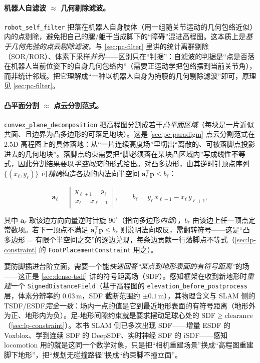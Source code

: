 \paragraph{机器人自滤波 $\approx$ 几何剔除滤波。}
\texttt{robot\_self\_filter} 把落在机器人自身肢体（用一组随关节运动的几何包络近似）内的点剔除，避免把自己的腿/躯干当成脚下的“障碍”混进高程图。这本质上是\emph{基于几何先验的点云剔除滤波}，与 \cref{sec:pc-filter} 里讲的统计离群剔除（SOR/ROR）、体素下采样\emph{并列}——区别只在“判据”：自滤波的判据是“点是否落在机器人当前位姿下的自身几何包络内”（需要正运动学把包络摆到当前关节角），而非统计邻域。把它理解成“一种以机器人自身为掩膜的几何剔除滤波”即可，原理见 \cref{sec:pc-filter}。

\paragraph{凸平面分割 $\approx$ 点云分割范式。}
\texttt{convex\_plane\_decomposition} 把高程图分割成若干\emph{凸平面区域}（每块是一片近似共面、且边界为凸多边形的可落足地块）。这是 \cref{sec:pc-paradigm} 点云分割范式在 $2.5$D 高程图上的具体落地：从“一片连续高度场”里切出“离散的、可被落脚点投影进去的几何地块”。落脚点约束需要把“脚必须落在某块凸区域内”写成线性不等式，因此分割结果要以\emph{半空间交}的形式给出。对凸多边形，由其逆时针顶点序列 $\{(x_\ell,y_\ell)\}$ 可\emph{精确}构造各边的内法向半空间 $\mathbf{a}_\ell^\top \mathbf{p}\le b_\ell$：

\begin{equation}
  \mathbf{a}_\ell=\begin{bmatrix} y_{\ell+1}-y_\ell \\ x_\ell-x_{\ell+1} \end{bmatrix},
  \qquad
  b_\ell = y_\ell\,x_{\ell+1} - x_\ell\,y_{\ell+1},
  \label{eq:lp-halfspace}
\end{equation}

其中 $\mathbf{a}_\ell$ 取该边方向向量逆时针旋 $90^\circ$（指向多边形\emph{内部}），$b_\ell$ 由该边上任一顶点定常数项。若下一顶点不满足 $\mathbf{a}_\ell^\top \mathbf{p}\le b_\ell$ 则说明法向取反，需翻转符号——这是“凸多边形 = 有限个半空间之交”的逐边兑现，每条边贡献一行落脚点不等式（\cref{sec:lp-constraint} 的 \texttt{FootPlacementConstraint} 用之）。

\begin{insight}[足-地形碰撞 = 在地形 SDF 上查间隙，接 P2 的 TSDF/ESDF]\label{ins:lp-sdf}
要防脚插进台阶立面，需要一个能\emph{快速回答“某点到地形表面的有符号距离”}的场——这正是 \cref{sec:dense-tsdf} 讲的符号距离场（SDF）。感知框架在收到新地形时\emph{重建}一个 \texttt{SignedDistanceField}（基于高程图的 \texttt{elevation\_before\_postprocess} 层，体素分辨率约 $0.03\,$m，SDF 截断范围约 $\pm 0.1\,$m），其物理含义与 SLAM 侧的 TSDF/ESDF\emph{完全一致}：场内一点的值是它到最近地形表面的有符号距离（地形外为正、地形内为负）。足-地形间隙约束就是要求摆动足球心处的 $\mathrm{SDF}\ge \text{clearance}$（\cref{sec:lp-constraint}）。本书 SLAM 侧已多次出现 SDF——增量 ESDF 的 Voxblox\cite{oleynikova2017voxblox}、学到连续 SDF 的 DeepSDF\cite{park2019deepsdf}、实时神经 SDF 的 iSDF\cite{ortiz2022isdf}——感知 locomotion 用的就是这同一个数学对象，只是把“相机重建场景”换成“高程图重建脚下地形”，把“规划无碰撞路径”换成“约束脚不撞立面”。
\end{insight}

